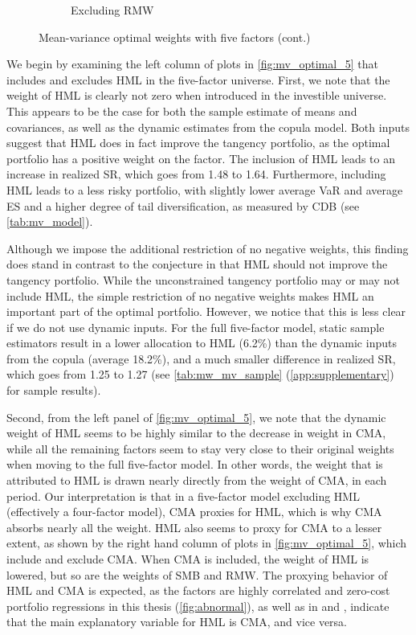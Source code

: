 \begin{figure}[p]
\begin{subfigure}{0.45\textwidth}
    \caption{Excluding RMW}
  \end{subfigure}  
  \footnotesize
  \caption{Mean-variance optimal weights with five factors (cont.)}
\end{figure}

We begin by examining the left column of plots in \autoref{fig:mv_optimal_5} that includes and excludes HML in the five-factor universe. First, we note that the weight of HML is clearly not zero when introduced in the investible universe. This appears to be the case for both the sample estimate of means and covariances, as well as the dynamic estimates from the copula model. Both inputs suggest that HML does in fact improve the tangency portfolio, as the optimal portfolio has a positive weight on the factor. The inclusion of HML leads to an increase in realized SR, which goes from 1.48 to 1.64. Furthermore, including HML leads to a less risky portfolio, with slightly lower average VaR and average ES and a higher degree of tail diversification, as measured by CDB (see \autoref{tab:mv_model}).

Although we impose the additional restriction of no negative weights, this finding does stand in contrast to the conjecture in \textcite{FF2015} that HML should not improve the tangency portfolio. While the unconstrained tangency portfolio may or may not include HML, the simple restriction of no negative weights makes HML an important part of the optimal portfolio. However, we notice that this is less clear if we do not use dynamic inputs. For the full five-factor model, static sample estimators result in a lower allocation to HML (6.2\%) than the dynamic inputs from the copula (average 18.2\%), and a much smaller difference in realized SR, which goes from 1.25 to 1.27 (see \autoref{tab:mw_mv_sample} (\autoref{app:supplementary}) for sample results).

Second, from the left panel of \autoref{fig:mv_optimal_5}, we note that the dynamic weight of HML seems to be highly similar to the decrease in weight in CMA, while all the remaining factors seem to stay very close to their original weights when moving to the full five-factor model. In other words, the weight that is attributed to HML is drawn nearly directly from the weight of CMA, in each period. Our interpretation is that in a five-factor model excluding HML (effectively a four-factor model), CMA proxies for HML, which is why CMA absorbs nearly all the weight. HML also seems to proxy for CMA to a lesser extent, as shown by the right hand column of plots in \autoref{fig:mv_optimal_5}, which include and exclude CMA. When CMA is included, the weight of HML is lowered, but so are the weights of SMB and RMW. The proxying behavior of HML and CMA is expected, as the factors are highly correlated and zero-cost portfolio regressions in this thesis (\autoref{fig:abnormal}), as well as in \textcite{FF2015} and \textcite{Asness2015}, indicate that the main explanatory variable for HML is CMA, and vice versa.

